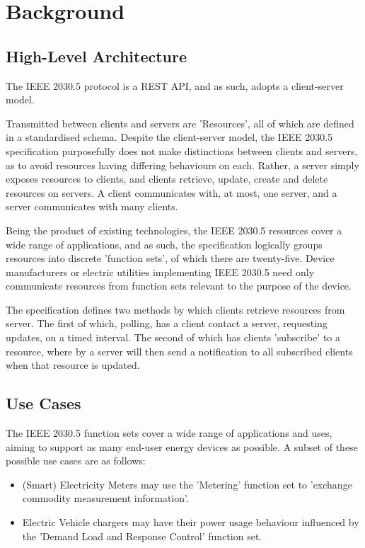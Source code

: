 \chapter{Background}\label{ch:background}

\section{High-Level Architecture}
The IEEE 2030.5 protocol is a REST API, and as such, adopts a client-server model.

Transmitted between clients and servers are 'Resources', all of which are defined in a standardised schema. 
Despite the client-server model, the IEEE 2030.5 specification purposefully does not make distinctions between clients and servers, as to avoid resources having differing behaviours on each. Rather, a server simply exposes resources to clients, and clients retrieve, update, create and delete resources on servers.
A client communicates with, at most, one server, and a server communicates with many clients.

Being the product of existing technologies, the IEEE 2030.5 resources cover a wide range of applications, and as such, the specification logically groups resources into discrete 'function sets', of which there are twenty-five. 
Device manufacturers or electric utilities implementing IEEE 2030.5 need only communicate resources from function sets relevant to the purpose of the device. 

The specification defines two methods by which clients retrieve resources from server. The first of which, polling, has a client contact a server, requesting updates, on a timed interval. 
The second of which has clients 'subscribe' to a resource, where by a server will then send a notification to all subscribed clients when that resource is updated.
\cite{IEEE2030.5}

\section{Use Cases}
The IEEE 2030.5 function sets cover a wide range of applications and uses, aiming to support as many end-user energy devices as possible. A subset of these possible use cases are as follows:
\begin{itemize}
    \item (Smart) Electricity Meters may use the 'Metering' function set to 'exchange commodity measurement information'. \cite{IEEE2030.5}
    \item Electric Vehicle chargers may have their power usage behaviour influenced by the 'Demand Load and Response Control' function set.
\end{itemize}


